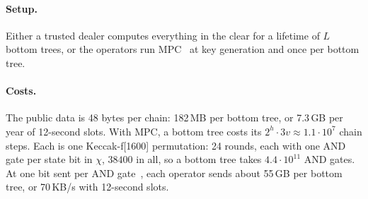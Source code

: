 \documentclass[11pt]{article}
\begin{document}
\paragraph{Setup.} Either a trusted dealer computes everything in the clear for a lifetime of $L$ bottom trees, or the operators run MPC~\cite{CDI05,GS20} at key generation and once per bottom tree.

\paragraph{Costs.} The public data is 48 bytes per chain: 182\,MB per bottom tree, or 7.3\,GB per year of 12-second slots. With MPC, a bottom tree costs its $2^h\cdot3v\approx1.1\cdot10^7$ chain steps. Each is one Keccak-f[1600] permutation: 24 rounds, each with one AND gate per state bit in $\chi$, $38400$ in all, so a bottom tree takes $4.4\cdot10^{11}$ AND gates. At one bit sent per AND gate~\cite{AFLNO16}, each operator sends about 55\,GB per bottom tree, or 70\,KB/s with 12-second slots.



\end{document}
